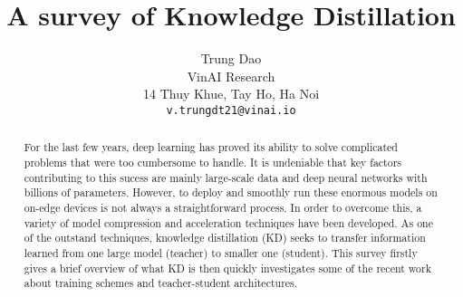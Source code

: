 \documentclass[10pt,twocolumn,letterpaper]{article}
\begin{document}
\title{A survey of Knowledge Distillation}

\author{Trung Dao\\
VinAI Research\\
14 Thuy Khue, Tay Ho, Ha Noi\\
{\tt\small v.trungdt21@vinai.io}
}

\maketitle

\begin{abstract}
   For the last few years, deep learning has proved its ability to solve complicated problems that were too cumbersome to handle. It is undeniable that key factors contributing to this sucess are mainly large-scale data and deep neural networks with billions of parameters. However, to deploy and smoothly run these enormous models on on-edge devices is not always a straightforward process. In order to overcome this, a variety of model compression and acceleration techniques have been developed. As one of the outstand techniques, knowledge distillation (KD) seeks to transfer information learned from one large model (teacher) to smaller one (student). This survey firstly gives a brief overview of what KD is then quickly investigates some of the recent work about training schemes and teacher-student architectures.
\end{abstract}





{\small


}
\end{document}
